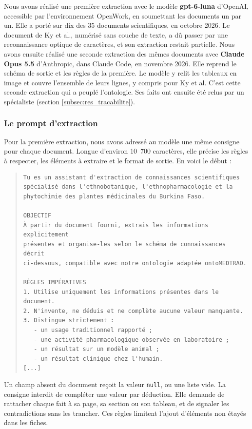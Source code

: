 Nous avons réalisé une première extraction avec le modèle \textbf{gpt-6-luna} d'OpenAI, accessible par l'environnement OpenWork, en soumettant les documents un par un. Elle a porté sur dix des 35 documents scientifiques, en octobre 2026. Le document de Ky et al., numérisé sans couche de texte, a dû passer par une reconnaissance optique de caractères, et son extraction restait partielle. Nous avons ensuite réalisé une seconde extraction des mêmes documents avec \textbf{Claude Opus 5.5} d'Anthropic, dans Claude Code, en novembre 2026. Elle reprend le schéma de sortie et les règles de la première. Le modèle y relit les tableaux en image et couvre l'ensemble de leurs lignes, y compris pour Ky et al. C'est cette seconde extraction qui a peuplé l'ontologie. Ses faits ont ensuite été relus par un spécialiste (section \ref{subsec:res_tracabilite}).

\subsubsection{Le prompt d'extraction}

Pour la première extraction, nous avons adressé au modèle une même consigne pour chaque document. Longue d'environ 10~700 caractères, elle précise les règles à respecter, les éléments à extraire et le format de sortie. En voici le début :

\begin{quote}
\begin{verbatim}
Tu es un assistant d'extraction de connaissances scientifiques
spécialisé dans l'ethnobotanique, l'ethnopharmacologie et la
phytochimie des plantes médicinales du Burkina Faso.

OBJECTIF
À partir du document fourni, extrais les informations explicitement
présentes et organise-les selon le schéma de connaissances décrit
ci-dessous, compatible avec notre ontologie adaptée ontoMEDTRAD.

RÈGLES IMPÉRATIVES
1. Utilise uniquement les informations présentes dans le document.
2. N'invente, ne déduis et ne complète aucune valeur manquante.
3. Distingue strictement :
   - un usage traditionnel rapporté ;
   - une activité pharmacologique observée en laboratoire ;
   - un résultat sur un modèle animal ;
   - un résultat clinique chez l'humain.
[...]
\end{verbatim}
\end{quote}

Un champ absent du document reçoit la valeur \texttt{null}, ou une liste vide. La consigne interdit de compléter une valeur par déduction. Elle demande de rattacher chaque fait à sa page, sa section ou son tableau, et de signaler les contradictions sans les trancher. Ces règles limitent l'ajout d'éléments non étayés dans les fiches.

